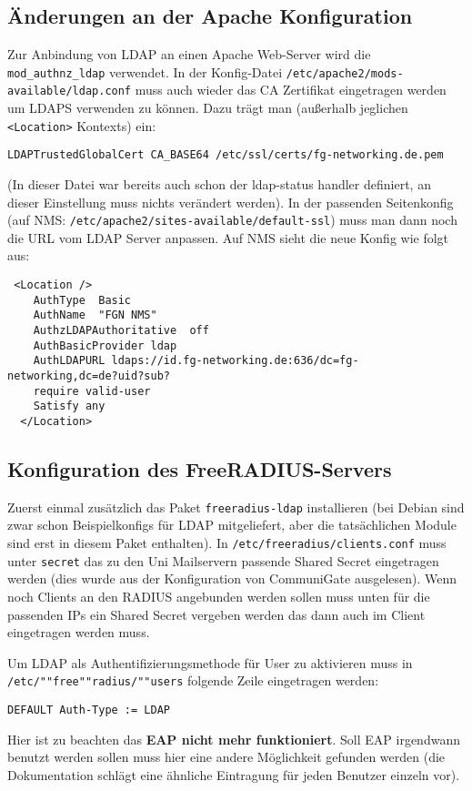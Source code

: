 \subsection{Änderungen an der Apache Konfiguration}\label{sec:Apache-Konfig}
Zur Anbindung von LDAP an einen Apache Web-Server wird die \texttt{mod\_authnz\_ldap} verwendet. In der Konfig-Datei \texttt{/etc/apache2/mods-available/ldap.conf} muss auch wieder das CA Zertifikat eingetragen werden um LDAPS verwenden zu können. Dazu trägt man (außerhalb jeglichen \texttt{<Location>} Kontexts) ein:
\begin{lstlisting}
LDAPTrustedGlobalCert CA_BASE64 /etc/ssl/certs/fg-networking.de.pem
\end{lstlisting}
(In dieser Datei war bereits auch schon der ldap-status handler definiert, an dieser Einstellung muss nichts verändert werden). In der passenden Seitenkonfig (auf NMS: \texttt{/etc/apache2/sites-available/default-ssl}) muss man dann noch die URL vom LDAP Server anpassen. Auf NMS sieht die neue Konfig wie folgt aus:
\begin{lstlisting}
 <Location />
    AuthType  Basic
    AuthName  "FGN NMS"
    AuthzLDAPAuthoritative  off
    AuthBasicProvider ldap
    AuthLDAPURL ldaps://id.fg-networking.de:636/dc=fg-networking,dc=de?uid?sub?
    require valid-user
    Satisfy any
  </Location>
\end{lstlisting}


\subsection{Konfiguration des FreeRADIUS-Servers}\label{sec:RADIUS-Konfig}
Zuerst einmal zusätzlich das Paket \texttt{freeradius-ldap} installieren (bei Debian sind zwar schon Beispielkonfigs für LDAP mitgeliefert, aber die tatsächlichen Module sind erst in diesem Paket enthalten). In \texttt{/etc/freeradius/clients.conf} muss unter \texttt{secret} das zu den Uni Mailservern passende Shared Secret eingetragen werden (dies wurde aus der Konfiguration von CommuniGate ausgelesen). Wenn noch Clients an den RADIUS angebunden werden sollen muss unten für die passenden IPs ein Shared Secret vergeben werden das dann auch im Client eingetragen werden muss.

Um LDAP als Authentifizierungsmethode für User zu aktivieren muss in \texttt{/etc/""free""radius/""users} folgende Zeile eingetragen werden:
\begin{lstlisting}
DEFAULT Auth-Type := LDAP
\end{lstlisting}
Hier ist zu beachten das \textbf{EAP nicht mehr funktioniert}. Soll EAP irgendwann benutzt werden sollen muss hier eine andere Möglichkeit gefunden werden (die Dokumentation schlägt eine ähnliche Eintragung für jeden Benutzer einzeln vor).


